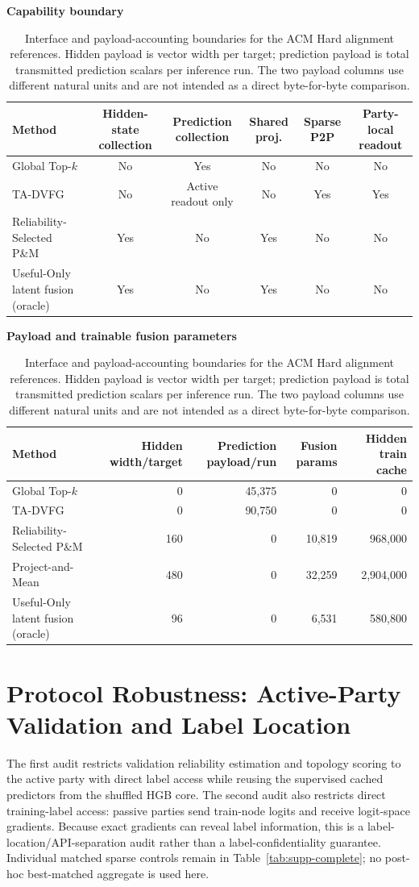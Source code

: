 \documentclass[letterpaper]{article}
\newcommand{\method}{\textsc{TA-DVFG}}
\begin{document}
\begin{table}[!t]
\centering
\caption{Interface and payload-accounting boundaries for the ACM Hard alignment
references. Hidden payload is vector width per target; prediction payload is
total transmitted prediction scalars per inference run. The two payload columns
use different natural units and are not intended as a direct byte-for-byte
comparison.}
\label{tab:supp-alignment-boundaries}
\scriptsize
\textbf{Capability boundary}\\[2pt]
\begin{tabular}{lccccc}
\toprule
Method & Hidden-state collection & Prediction collection & Shared proj. & Sparse P2P & Party-local readout \\
\midrule
Global Top-$k$ & No & Yes & No & No & No \\
\method{} & No & Active readout only & No & Yes & Yes \\
Reliability-Selected P\&M & Yes & No & Yes & No & No \\
Useful-Only latent fusion (oracle) & Yes & No & Yes & No & No \\
\bottomrule
\end{tabular}

\vspace{5pt}
\textbf{Payload and trainable fusion parameters}\\[2pt]
\begin{tabular}{lrrrr}
\toprule
Method & Hidden width/target & Prediction payload/run & Fusion params & Hidden train cache \\
\midrule
Global Top-$k$ & 0 & 45,375 & 0 & 0 \\
\method{} & 0 & 90,750 & 0 & 0 \\
Reliability-Selected P\&M & 160 & 0 & 10,819 & 968,000 \\
Project-and-Mean & 480 & 0 & 32,259 & 2,904,000 \\
Useful-Only latent fusion (oracle) & 96 & 0 & 6,531 & 580,800 \\
\bottomrule
\end{tabular}
\end{table}


\section{Protocol Robustness: Active-Party Validation and Label Location}
\label{sec:supp-protocol}

The first audit restricts validation reliability estimation and topology scoring
to the active party with direct label access while reusing the supervised cached
predictors from the shuffled HGB core. The second audit also restricts direct
training-label access: passive parties send train-node logits and receive
logit-space gradients. Because exact gradients can reveal label information,
this is a label-location/API-separation audit rather than a
label-confidentiality guarantee. Individual matched sparse controls remain in
Table~\ref{tab:supp-complete}; no post-hoc best-matched aggregate is used here.
\end{document}
